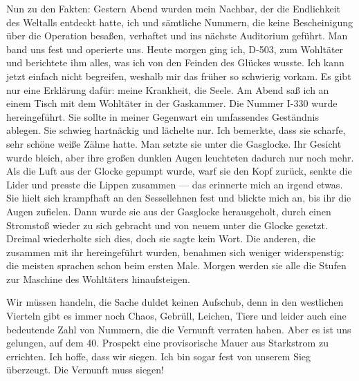 Nun zu den Fakten: Gestern Abend wurden mein Nachbar, der die
Endlichkeit des Weltalls entdeckt hatte, ich und sämtliche Nummern,
die keine Bescheinigung über die Operation besaßen, verhaftet und
ins nächste Auditorium geführt. Man band uns fest und operierte
uns. Heute morgen ging ich, D-503, zum Wohltäter und berichtete ihm
alles, was ich von den Feinden des Glückes wusste. Ich kann jetzt
einfach nicht begreifen, weshalb mir das früher so schwierig
vorkam. Es gibt nur eine Erklärung dafür: meine Krankheit, die
Seele. Am Abend saß ich an einem Tisch mit dem Wohltäter in der
Gaskammer. Die Nummer I-330 wurde hereingeführt. Sie sollte in
meiner Gegenwart ein umfassendes Geständnis ablegen. Sie schwieg
hartnäckig und lächelte nur. Ich bemerkte, dass sie scharfe, sehr
schöne weiße Zähne hatte. Man setzte sie unter die Gasglocke. Ihr
Gesicht wurde bleich, aber ihre großen dunklen Augen leuchteten
dadurch nur noch mehr. Als die Luft aus der Glocke gepumpt wurde,
warf sie den Kopf zurück, senkte die Lider und presste die Lippen
zusammen — das erinnerte mich an irgend etwas. Sie hielt sich
krampfhaft an den Sessellehnen fest und blickte mich an, bis ihr
die Augen zufielen. Dann wurde sie aus der Gasglocke herausgeholt,
durch einen Stromstoß wieder zu sich gebracht und von neuem unter
die Glocke gesetzt. Dreimal wiederholte sich dies, doch sie sagte
kein Wort. Die anderen, die zusammen mit ihr hereingeführt wurden,
benahmen sich weniger widerspenstig: die meisten sprachen schon
beim ersten Male. Morgen werden sie alle die Stufen zur Maschine
des Wohltäters hinaufsteigen.

Wir müssen handeln, die Sache duldet keinen Aufschub, denn in den
westlichen Vierteln gibt es immer noch Chaos, Gebrüll, Leichen,
Tiere und leider auch eine bedeutende Zahl von Nummern, die die
Vernunft verraten haben. Aber es ist uns gelungen, auf dem 40.
Prospekt eine provisorische Mauer aus Starkstrom zu errichten. Ich
hoffe, dass wir siegen. Ich bin sogar fest von unserem Sieg
überzeugt. Die Vernunft muss siegen!
